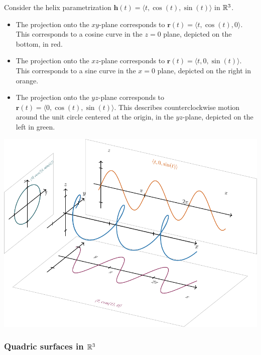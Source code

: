 \begin{example}
Consider the helix parametrization $\bm{h}(t) = \langle t, \cos(t), \sin(t) \rangle$ in $\mathbb{R}^3$.

\begin{itemize}
    \item The projection onto the $xy$-plane corresponds to $\bm{r}(t) = \langle t, \cos(t), 0 \rangle$.  This corresponds to a cosine curve in the $z=0$ plane, depicted on the bottom, in red.
    \item The projection onto the $xz$-plane corresponds to $\bm{r}(t) = \langle t, 0, \sin(t)\rangle$.  This corresponds to a sine curve in the $x=0$ plane, depicted on the right in orange.
    \item The projection onto the $yz$-plane corresponds to $\bm{r}(t) = \langle 0, \cos(t), \sin(t) \rangle$.  This describes counterclockwise motion around the unit circle centered at the origin, in the $yz$-plane, depicted on the left in green.  
\end{itemize}

\begin{center}
    \includegraphics{chapters/2-RealAnalysis/figures/figures-projections.pdf}
\end{center}

\end{example}





\subsubsection{Quadric surfaces in $\mathbb{R}^3$}

